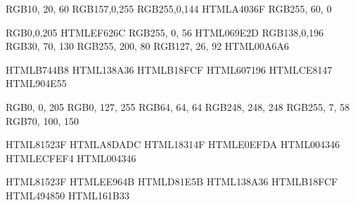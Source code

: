 
\definecolor{chaptercolor}     {RGB}{10,  20,  60}
\definecolor{sectioncolor}     {RGB}{157,0,255}
\definecolor{subsectioncolor}  {RGB}{255,0,144}
\definecolor{subsubcolor}      {HTML}{A4036F}
\definecolor{paragraphcolor}   {RGB}{255, 60, 0}

\definecolor{defcolor}         {RGB}{0,0,205}
\definecolor{termcolor}        {HTML}{EF626C}
\definecolor{formulacolor}     {RGB}{255, 0,  56}
\definecolor{infocolor}        {HTML}{069E2D}
\definecolor{examplecolor}     {RGB}{138,0,196}
\definecolor{derivcolor}       {RGB}{30,  70,  130}
\definecolor{summarycolor}     {RGB}{255, 200, 80}
\definecolor{warningcolor}     {RGB}{127, 26, 92}
\definecolor{notecolor}        {HTML}{00A6A6}

\definecolor{itemizeonecolor}  {HTML}{B744B8}
\definecolor{itemizetwocolor}  {HTML}{138A36}
\definecolor{itemizefourcolor} {HTML}{B18FCF}
\definecolor{enumonecolor}     {HTML}{607196}
\definecolor{enumtwocolor}     {HTML}{CE8147}
\definecolor{enumthreecolor}   {HTML}{904E55}

\definecolor{primaryblue}      {RGB}{0,   0,   205}
\definecolor{secondaryblue}    {RGB}{0,   127, 255}
\definecolor{darkgray}         {RGB}{64,  64,  64}
\definecolor{lightgray}        {RGB}{248, 248, 248}
\definecolor{dangerred}        {RGB}{255, 7,   58}
\definecolor{headerline}       {RGB}{70,  100, 150}

\definecolor{tablebannerbg}    {HTML}{81523F}
\definecolor{tablecolhdbg}     {HTML}{A8DADC}
\definecolor{tablecolhdtext}   {HTML}{18314F}
\definecolor{tablebannertext}  {HTML}{E0EFDA}
\definecolor{tablerail}        {HTML}{004346}
\definecolor{tablezebrarow}    {HTML}{ECFEF4}
\definecolor{tablegrid}        {HTML}{004346}

\newcommand{\colorswatch}[1]{%
    \begingroup
    \definecolor{tempswatch}{HTML}{#1}%
    \fcolorbox{tablegrid}{tempswatch}{\rule{0pt}{0.1cm}\rule{0.1cm}{0pt}}%
    \endgroup
}

\definecolor{htmltagcolor}       {HTML}{81523F}
\definecolor{htmlattrcolor}      {HTML}{EE964B}
\definecolor{htmlstringcolor}    {HTML}{D81E5B}
\definecolor{htmlcommentcolor}   {HTML}{138A36}
\definecolor{htmlsymbolcolor}    {HTML}{B18FCF}
\definecolor{htmloperatorcolor}  {HTML}{494850}
\definecolor{htmltextcolor}      {HTML}{161B33}

